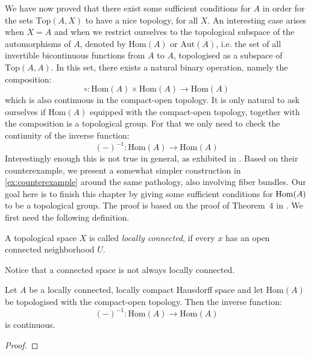 We have now proved that there exist some sufficient conditions for $A$ in order for the sets $\mathrm{Top}(A,X)$ to have a nice topology, for all $X$. An interesting case arises when $X=A$ and when we restrict ourselves to the topological subspace of the automorphisms of $A$, denoted by $\mathrm{Hom}(A)$ or $\mathrm{Aut}(A)$, i.e. the set of all invertible bicontinuous functions from $A$ to $A$, topologised as a subspace of $\mathrm{Top}(A,A)$. In this set, there exists a natural binary operation, namely the composition:
\[\circ:\mathrm{Hom}(A)\times\mathrm{Hom}(A)\to\mathrm{Hom}(A)\]
which is also continuous in the compact-open topology. It is only natural to ask ourselves if $\mathrm{Hom}(A)$ equipped with the compact-open topology, together with the composition is a topological group. For that we only need to check the continuity of the inverse function:
\[(-)^{-1}:\mathrm{Hom}(A)\to\mathrm{Hom}(A)\]
Interestingly enough this is not true in general, as exhibited in \cite{counterexample}. Based on their counterexample, we present a somewhat simpler construction in \ref{ex:counterexample} around the same pathology, also involving fiber bundles. Our goal here is to finish this chapter by giving some sufficient conditions for $\mathrm{Hom}(A)$ to be a topological group. The proof is based on the proof of Theorem~4 in \cite{top_group}. We first need the following definition.

\begin{definition} A topological space $X$ is called \emph{locally connected}, if every $x$ has an open connected neighborhood $U$.
\end{definition}
\begin{remark} Notice that a connected space is not always locally connected.
\end{remark}

\begin{theorem}\label{thm:inverse} Let $A$ be a locally connected, locally compact Hausdorff space and let $\mathrm{Hom}(A)$ be topologised with the compact-open topology. Then the inverse function:
\[(-)^{-1}:\mathrm{Hom}(A)\to\mathrm{Hom}(A)\]
is continuous.
\end{theorem}
\begin{proof}
\end{proof}















